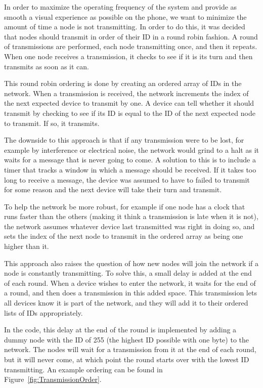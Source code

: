 In order to maximize the operating frequency of the system and provide as smooth a visual experience as possible on the phone, we want to minimize the amount of time a node is not transmitting. In order to do this, it was decided that nodes should transmit in order of their ID in a round robin fashion. A round of transmissions are performed, each node transmitting once, and then it repeats. When one node receives a transmission, it checks to see if it is its turn and then transmits as soon as it can.

This round robin ordering is done by creating an ordered array of IDs in the network. When a transmission is received, the network increments the index of the next expected device to transmit by one. A device can tell whether it should transmit by checking to see if its ID is equal to the ID of the next expected node to transmit. If so, it transmits. 

The downside to this approach is that if any transmission were to be lost, for example by interference or electrical noise, the network would grind to a halt as it waits for a message that is never going to come. A solution to this is to include a timer that tracks a window in which a message should be received. If it takes too long to receive a message, the device was assumed to have to failed to transmit for some reason and the next device will take their turn and transmit.

To help the network be more robust, for example if one node has a clock that runs faster than the others (making it think a transmission is late when it is not), the network assumes whatever device last transmitted was right in doing so, and sets the index of the next node to transmit in the ordered array as being one higher than it.

This approach also raises the question of how new nodes will join the network if a node is constantly transmitting. To solve this, a small delay is added at the end of each round. When a device wishes to enter the network, it waits for the end of a round, and then does a transmission in this added space. This transmission lets all devices know it is part of the network, and they will add it to their ordered lists of IDs appropriately. 

In the code, this delay at the end of the round is implemented by adding a dummy node with the ID of 255 (the highest ID possible with one byte) to the network. The nodes will wait for a transmission from it at the end of each round, but it will never come, at which point the round starts over with the lowest ID transmitting. An example ordering can be found in Figure~\ref{fig:TransmissionOrder}.

